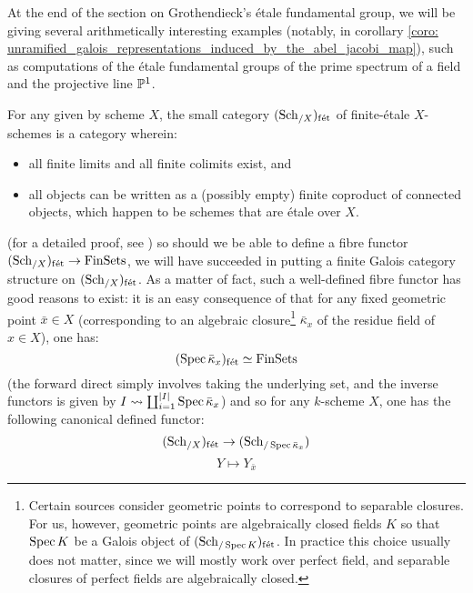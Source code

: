                 At the end of the section on Grothendieck's \'etale fundamental group, we will be giving several arithmetically interesting examples (notably, in corollary \ref{coro: unramified_galois_representations_induced_by_the_abel_jacobi_map}), such as computations of the \'etale fundamental groups of the prime spectrum of a field and the projective line $\P^1$.
                \begin{remark} \label{remark: finite_etale_schemes}
                    For any given by scheme $X$, the small category $(\Sch_{/X})_{\fet}$ of finite-\'etale $X$-schemes is a category wherein:
                        \begin{itemize}
                            \item all finite limits and all finite colimits exist, and
                            \item all objects can be written as a (possibly empty) finite coproduct of connected objects, which happen to be schemes that are \'etale over $X$.  
                        \end{itemize}
                    (for a detailed proof, see \cite[\href{https://stacks.math.columbia.edu/tag/0BN9}{Tag 0BN9}]{stacks}) so should we be able to define a fibre functor $(\Sch_{/X})_{\fet} \to \Fin\Sets$, we will have succeeded in putting a finite Galois category structure on $(\Sch_{/X})_{\fet}$. As a matter of fact, such a well-defined fibre functor has good reasons to exist: it is an easy consequence of \cite[\href{https://stacks.math.columbia.edu/tag/00U3}{Tag 00U3}]{stacks} that for any fixed geometric point $\bar{x} \in X$ (corresponding to an algebraic closure\footnote{Certain sources consider geometric points to correspond to separable closures. For us, however, geometric points are algebraically closed fields $K$ so that $\Spec K$ be a Galois object of $(\Sch_{/\Spec K})_{\fet}$. In practice this choice usually does not matter, since we will mostly work over perfect field, and separable closures of perfect fields are algebraically closed.} $\bar{\kappa}_x$ of the residue field of $x \in X$), one has:
                        $$(\Spec \bar{\kappa}_x)_{\fet} \cong \Fin\Sets$$
                    (the forward direct simply involves taking the underlying set, and the inverse functors is given by $I \mapsto \coprod_{i = 1}^{|I|} \Spec \bar{\kappa}_x$) and so for any $k$-scheme $X$, one has the following canonical defined functor:
                        $$(\Sch_{/X})_{\fet} \to (\Sch_{/\Spec \bar{\kappa}_x})$$
                        $$Y \mapsto Y_{\bar{x}}$$

\end{remark}
